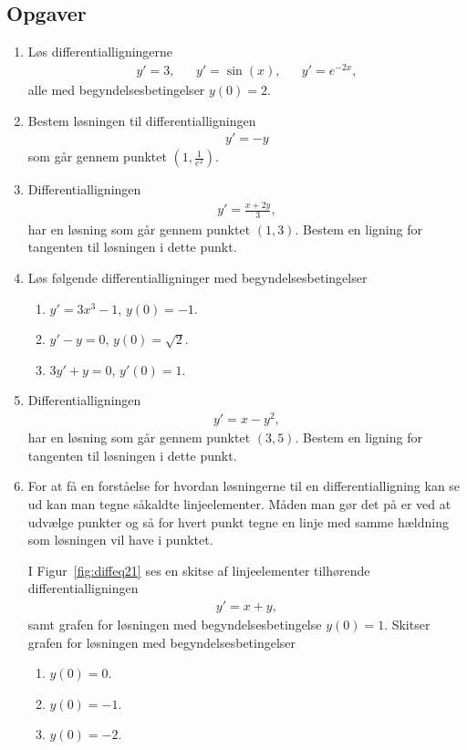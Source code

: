 \subsection{Opgaver}
\begin{enumerate}
	\item Løs differentialligningerne
	\begin{align*}
	y'=3,&&y'=\sin(x),&&y'=e^{-2x},
	\end{align*}
	alle med begyndelsesbetingelser $y(0)=2$.
	
	\item Bestem løsningen til differentialligningen
	\begin{align*}
	y'=-y
	\end{align*}
	som går gennem punktet $(1,\frac{1}{e^2})$. 
	
	\item Differentialligningen
	\begin{align*}
	y'=\frac{x+2y}{3},
	\end{align*}
	har en løsning som går gennem punktet $(1,3)$. Bestem en ligning for tangenten til løsningen i dette punkt.

	\item Løs følgende differentialligninger med begyndelsesbetingelser
\begin{enumerate}
	\item $y'=3x^3-1$, $y(0)=-1$.
	\item $y'-y=0$, $y(0)=\sqrt{2}$.
	\item $3y'+y=0$, $y'(0)=1$.
\end{enumerate}	
	
		\item Differentialligningen
	\begin{align*}
	y'=x-y^2,
	\end{align*}
	har en løsning som går gennem punktet $(3,5)$. Bestem en ligning for tangenten til løsningen i dette punkt.
	
		\item\label{it:diffeq21} For at få en forståelse for hvordan løsningerne til en differentialligning kan se ud kan man tegne såkaldte linjeelementer. Måden man gør det på er ved at udvælge punkter og så for hvert punkt tegne en linje med samme hældning som løsningen vil have i punktet. 
	
	I Figur~\ref{fig:diffeq21} ses en skitse af linjeelementer tilhørende differentialligningen
	\begin{align*}
	y'=x+y,
	\end{align*}
	samt grafen for løsningen med begyndelsesbetingelse $y(0)=1$. Skitser grafen for løsningen med begyndelsesbetingelser
	\begin{enumerate}
		\item $y(0)=0$.
		\item $y(0)=-1$.
		\item $y(0)=-2$.
	\end{enumerate}
	

\end{enumerate}

